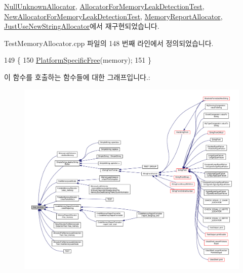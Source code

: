 \hyperlink{class_null_unknown_allocator_a7c662c2adde1ec0a375b14c0d106b6d5}{Null\+Unknown\+Allocator}, \hyperlink{class_allocator_for_memory_leak_detection_test_a529ac9813d3b0836ce0b964449942534}{Allocator\+For\+Memory\+Leak\+Detection\+Test}, \hyperlink{class_new_allocator_for_memory_leak_detection_test_a529ac9813d3b0836ce0b964449942534}{New\+Allocator\+For\+Memory\+Leak\+Detection\+Test}, \hyperlink{class_memory_report_allocator_a7c662c2adde1ec0a375b14c0d106b6d5}{Memory\+Report\+Allocator}, \hyperlink{class_just_use_new_string_allocator_a1b6314451773d6734f774813bffac1b2}{Just\+Use\+New\+String\+Allocator}에서 재구현되었습니다.



Test\+Memory\+Allocator.\+cpp 파일의 148 번째 라인에서 정의되었습니다.


\begin{DoxyCode}
149 \{
150     \hyperlink{_platform_specific_functions__c_8h_ab6e55e1039f55ca7f3efb4d6a60c5d7f}{PlatformSpecificFree}(memory);
151 \}
\end{DoxyCode}


이 함수를 호출하는 함수들에 대한 그래프입니다.\+:
\nopagebreak
\begin{figure}[H]
\begin{center}
\leavevmode
\includegraphics[width=350pt]{class_test_memory_allocator_a529ac9813d3b0836ce0b964449942534_icgraph}
\end{center}
\end{figure}


